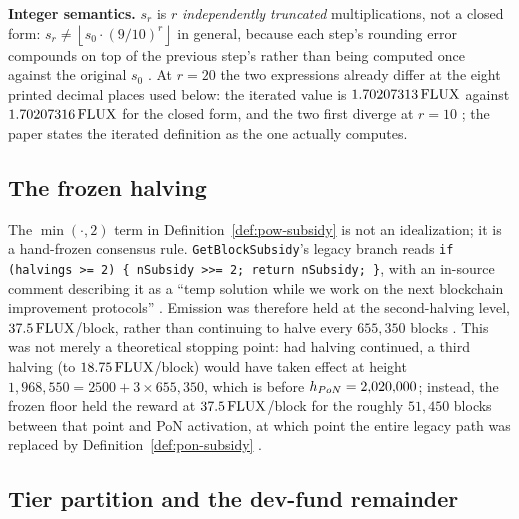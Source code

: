 \textbf{Integer semantics.} $s_{r}$ is $r$ \emph{independently truncated} multiplications, not a
closed form: $s_r \neq \left\lfloor s_0 \cdot (9/10)^{r} \right\rfloor$ in general, because each
step's rounding error compounds on top of the previous step's rather than being computed once
against the original $s_0$ \shipped {}. At $r=20$ the two
expressions already differ at the eight printed decimal places used below: the iterated value is
$1.70207313\,\mathrm{FLUX}$ against $1.70207316\,\mathrm{FLUX}$ for the closed form, and the two first diverge at $r=10$
\shipped {}; the paper
states the iterated definition as the one \fluxd actually computes.

\subsection{The frozen halving}
\label{sec:mp-frozen-halving}

The $\min(\cdot,2)$ term in Definition~\ref{def:pow-subsidy} is not an idealization; it is a
hand-frozen consensus rule. \texttt{Get\allowbreak{}Block\allowbreak{}Subsidy}'s legacy branch reads
\texttt{if (halvings >= 2) \{ nSubsidy >>= 2; return nSubsidy; \}}, with an in-source comment
describing it as a ``temp solution while we work on the next blockchain improvement protocols''
\shipped {}. Emission was therefore held at the second-halving
level, $37.5\,\mathrm{FLUX}$/block, rather than continuing to halve every $655{,}350$ blocks
\shipped {}. This was not merely a theoretical stopping point:
had halving continued, a third halving (to $18.75\,\mathrm{FLUX}$/block) would have taken effect at height
$1{,}968{,}550 = 2500 + 3\times655{,}350$, which is before $h_{PoN} = 2{,}020{,}000$; instead, the
frozen floor held the reward at $37.5\,\mathrm{FLUX}$/block for the roughly $51{,}450$ blocks between that
point and PoN activation, at which point the entire legacy path was replaced by
Definition~\ref{def:pon-subsidy} \shipped {}.

\subsection{Tier partition and the dev-fund remainder}
\label{sec:mp-tier-devfund}

